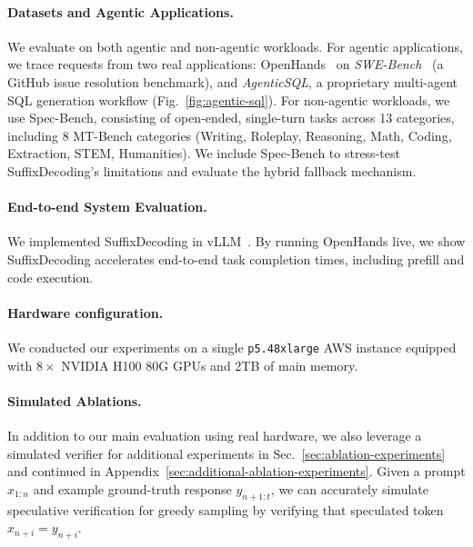 \paragraph{Datasets and Agentic Applications.}
We evaluate on both agentic and non-agentic workloads. For agentic applications, we trace requests from two real applications: OpenHands~\citep{openhands} on \emph{SWE-Bench}~\citep{jimenez2024swebenchlanguagemodelsresolve} (a GitHub issue resolution benchmark), and \emph{AgenticSQL}, a proprietary multi-agent SQL generation workflow (Fig.~\ref{fig:agentic-sql}). For non-agentic workloads, we use Spec-Bench, consisting of open-ended, single-turn tasks across 13 categories, including 8 MT-Bench categories (Writing, Roleplay, Reasoning, Math, Coding, Extraction, STEM, Humanities). We include Spec-Bench to stress-test SuffixDecoding's limitations and evaluate the hybrid fallback mechanism.

\paragraph{End-to-end System Evaluation.} We implemented SuffixDecoding in vLLM~\citep{kwon2023efficientmemorymanagementlarge}. By running OpenHands live, we show SuffixDecoding accelerates end-to-end task completion times, including prefill and code execution.

\paragraph{Hardware configuration.}
We conducted our experiments on a single \texttt{p5.48xlarge} AWS instance equipped with \( 8\times \) NVIDIA H100 80G GPUs and 2TB of main memory.

\paragraph{Simulated Ablations.}

In addition to our main evaluation using real hardware, we also leverage a simulated verifier for additional experiments in Sec.~\ref{sec:ablation-experiments} and continued in Appendix~\ref{sec:additional-ablation-experiments}. Given a prompt \( x_{1:n} \) and example ground-truth response \( y_{n+1:t} \), we can accurately simulate speculative verification for greedy sampling by verifying that speculated token \( x_{n+i} = y_{n+i} \).

